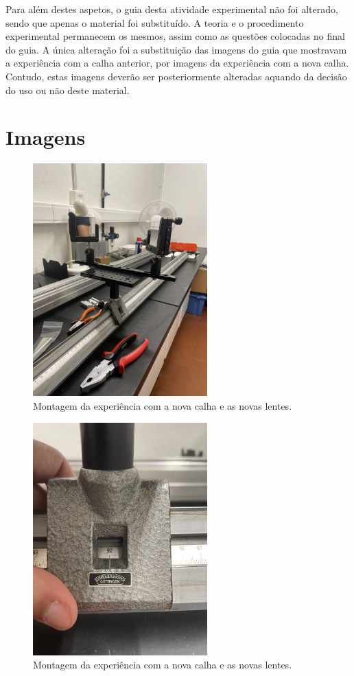 \documentclass[12pt,a4paper,oneside]{paper}
\begin{document}
Para além destes aspetos, o guia desta atividade experimental não foi alterado, sendo que apenas o material foi
substituído. A teoria e o procedimento experimental permanecem os mesmos, assim como as questões colocadas no final do guia.
A única alteração foi a substituição das imagens do guia que mostravam a experiência com a calha anterior, por imagens
da experiência com a nova calha. Contudo, estas imagens deverão ser posteriormente alteradas aquando da decisão do 
uso ou não deste material.

\section{Imagens}

\begin{figure}[H]
    \centering
    \includegraphics[width=0.6\textwidth]{IMG_2862.jpg}
    \caption{Montagem da experiência com a nova calha e as novas lentes.}
    \label{fig:montagem}
\end{figure}

\begin{figure}[H]
    \centering
    \includegraphics[width=0.6\textwidth]{IMG_2863.jpg}
    \caption{Montagem da experiência com a nova calha e as novas lentes.}
    \label{fig:montagem}
\end{figure}
\end{document}
